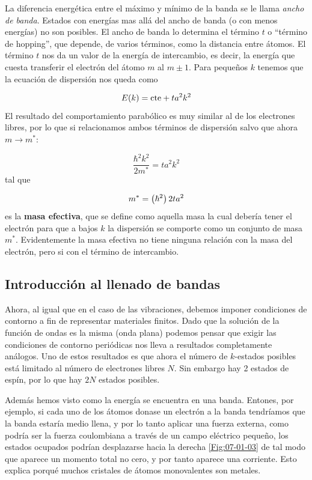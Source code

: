 La diferencia energética entre el máximo y mínimo de la banda se le llama \textit{ancho de banda}. Estados con energías mas allá del ancho de banda (o con menos energías) no son posibles. El ancho de banda lo determina el término $t$ o ``término de hopping'', que depende, de varios términos, como la distancia entre átomos. El término $t$ nos da un valor de la energía de intercambio, es decir, la energía que cuesta transferir el electrón del átomo $m$ al $m\pm 1$. Para pequeños $k$ tenemos que la ecuación de dispersión nos queda como

\begin{equation}
	E(k) = \text{cte} + ta^2 k^2
\end{equation}
El resultado del comportamiento parabólico es muy similar al de los electrones libres, por lo que si relacionamos ambos términos de dispersión salvo que ahora $m\rightarrow m^* $:

\begin{equation}
	\frac{\hbar^2 k^2}{2m^* } = t a^2 k^2
\end{equation}
tal que

\begin{equation}
	m^* = \left( \hbar^2 \right){2ta^2}
\end{equation}
es la \textbf{masa efectiva}, que se define como aquella masa la cual debería tener el electrón para que a bajos $k$ la dispersión se comporte como un conjunto de masa $m^*$. Evidentemente la masa efectiva no tiene ninguna relación con la masa del electrón, pero si con el término de intercambio. 


\subsection{Introducción al llenado de bandas}

Ahora, al igual que en el caso de las vibraciones, debemos imponer condiciones de contorno a fin de representar materiales finitos. Dado que la solución de la función de ondas es la misma (onda plana) podemos pensar que exigir las condiciones de contorno periódicas nos lleva a resultados completamente análogos. Uno de estos resultados es que ahora el número de $k$-estados posibles está limitado al número de electrones libres $N$. Sin embargo hay 2 estados de espín, por lo que hay $2N$ estados posibles. 

Además hemos visto como la energía se encuentra en una banda. Entones, por ejemplo, si cada uno de los átomos donase un electrón a la banda tendríamos que la banda estaría medio llena, y por lo tanto aplicar una fuerza externa, como podría ser la fuerza coulombiana a través de un campo eléctrico pequeño, los estados ocupados podrían desplazarse hacia la derecha \ref{Fig:07-01-03} de tal modo que aparece un momento total no cero, y por tanto aparece una corriente. Esto explica porqué muchos cristales de átomos monovalentes son metales.

